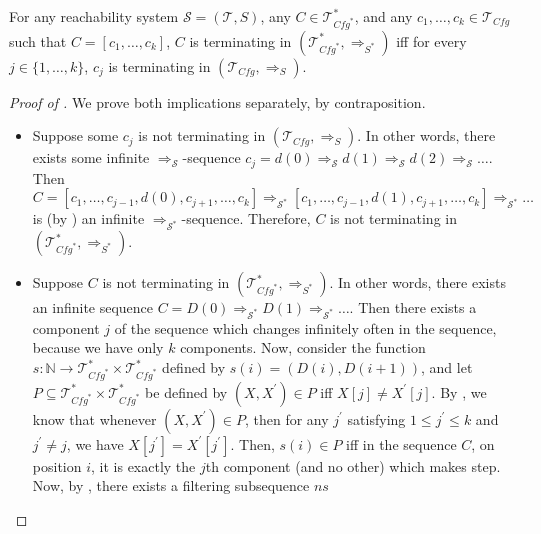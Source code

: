 \documentclass{article}
\newcommand{\Tcfg}{\mathcal{T}_{\mathit{Cfg}}}
\begin{document}
\begin{lemma}\label{lem:terminationComposite}
    For any reachability system $\mathcal{S} = (\mathcal{T}, S)$, any $C \in \mathcal{T}^*_{\mathit{Cfg}^*}$,
    and any $c_1,\ldots,c_k \in \Tcfg$ such that
    $C = [c_1,\ldots,c_k]$, $C$ is terminating in $(\mathcal{T}^*_{\mathit{Cfg}^*}, \Rightarrow_{S^*})$
    iff for every $j \in \{ 1, \ldots, k \}$, $c_j$ is terminating in $(\Tcfg, \Rightarrow_S)$.
\end{lemma}
\begin{proof}[Proof of ]
We prove both implications separately, by contraposition.
\begin{itemize}
    \item Suppose some $c_j$ is not terminating in $(\Tcfg, \Rightarrow_S)$.
    In other words, there exists some infinite $\Rightarrow_{\mathcal{S}}$-sequence
    $c_j = d(0) \Rightarrow_{\mathcal{S}} d(1) \Rightarrow_{\mathcal{S}} d(2) \Rightarrow_{\mathcal{S}} \ldots$.
    Then $C = [c_1,\ldots,c_{j-1}, d(0), c_{j+1}, \ldots, c_k] \Rightarrow_{\mathcal{S}^*}
    [c_1,\ldots,c_{j-1}, d(1), c_{j+1}, \ldots, c_k] \Rightarrow_{\mathcal{S}^*} \ldots$
    is (by ) an infinite $\Rightarrow_{\mathcal{S}^*}$-sequence.
    Therefore, $C$ is not terminating in $(\mathcal{T}^*_{\mathit{Cfg}^*}, \Rightarrow_{S^*})$.
    \item Suppose $C$ is not terminating in $(\mathcal{T}^*_{\mathit{Cfg}^*}, \Rightarrow_{S^*})$.
    In other words, there exists an infinite sequence $C = D(0) \Rightarrow_{\mathcal{S}^*} D(1) \Rightarrow_{\mathcal{S}^*} \ldots$.
    Then there exists a component $j$ of the sequence which changes infinitely often in the sequence,
    because we have only $k$ components.
    Now, consider the function $s : \mathbb{N} \to \mathcal{T}^*_{\mathit{Cfg}^*} \times \mathcal{T}^*_{\mathit{Cfg}^*}$
    defined by $s(i) = (D(i), D(i+1))$, and let $P \subseteq \mathcal{T}^*_{\mathit{Cfg}^*} \times \mathcal{T}^*_{\mathit{Cfg}^*}$
    be defined by $(X, X^\prime) \in P$ iff $X[j] \not = X^\prime[j]$.
    By , we know that whenever $(X, X^\prime) \in P$,
    then for any $j^\prime$ satisfying $1 \leq j^\prime \leq k$ and $j^\prime \not = j$,
    we have $X[j^\prime] = X^\prime[j^\prime]$.
    Then, $s(i) \in P$ iff in the sequence $C$, on position $i$, it is exactly the $j$th component (and no other)
    which makes step.
    Now, by , there exists a filtering subsequence $\mathit{ns}$

\end{itemize}
\end{proof}
\end{document}
